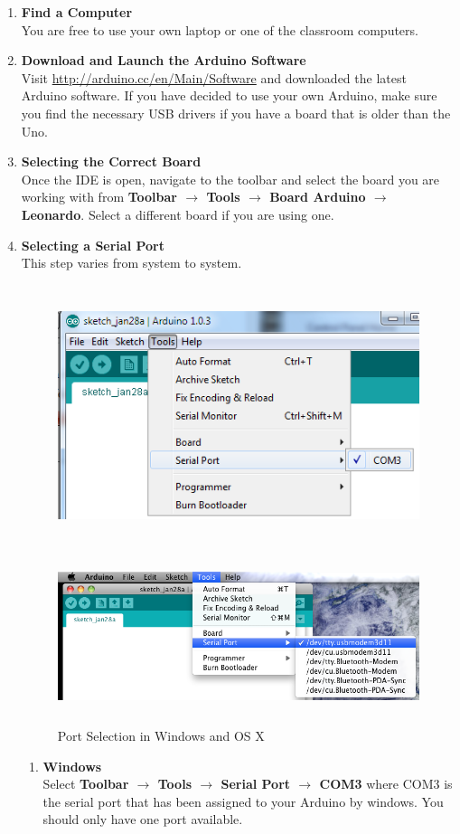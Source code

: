 \documentclass[11pt,a4paper]{article}
\begin{document}
\newcommand\litem[1]{\item{\bfseries #1\\}}
\begin{enumerate}

\litem{Find a Computer} You are free to use your own laptop or one of the classroom computers.

\litem{Download and Launch the Arduino Software} Visit \url{http://arduino.cc/en/Main/Software} and downloaded the latest Arduino software\cite{arduino-dl}.  If you have decided to use your own Arduino, make sure you find the necessary USB drivers if you have a board that is older than the Uno.

\litem{Selecting the Correct Board} Once the IDE is open, navigate to the toolbar and select the board you are working with from \textbf{Toolbar $\rightarrow$ Tools $\rightarrow$ Board Arduino $\rightarrow$ Leonardo}.  Select a different board if you are using one.

\litem{Selecting a Serial Port}  This step varies from system to system.
    \begin{figure}[htbp]
        \centering
            \includegraphics[height=3in]{figures/port-windows.png}
            
            
            \includegraphics[height=2in]{figures/port-osx.png}
        \caption{Port Selection in Windows and OS X}
        \label{fig:figures_port}
    \end{figure}
    \newcommand\slitem[1]{\item{\bfseries #1\\}}
    \begin{enumerate}
        \slitem{Windows}
        Select \textbf{Toolbar $\rightarrow$ Tools $\rightarrow$ Serial Port $\rightarrow$ COM3} where COM3 is the serial port that has been assigned to your Arduino by windows.  You should only have one port available.
        

\end{enumerate}
\end{enumerate}
\end{document}
